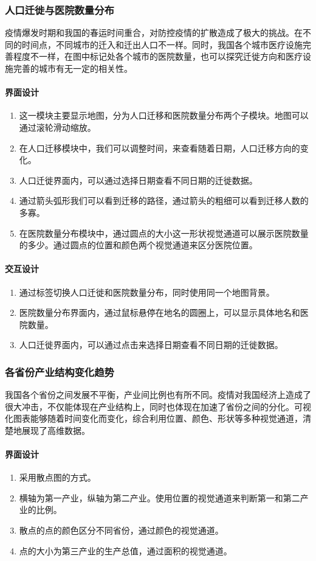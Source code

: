 \documentclass{ctexart}
\begin{document}
\subsubsection{人口迁徙与医院数量分布}
疫情爆发时期和我国的春运时间重合，对防控疫情的扩散造成了极大的挑战。在不同的时间点，不同城市的迁入和迁出人口不一样。同时，我国各个城市医疗设施完善程度不一样，在图中标记处各个城市的医院数量，也可以探究迁徙方向和医疗设施完善的城市有无一定的相关性。
\paragraph{界面设计}
\begin{enumerate}
    \item 这一模块主要显示地图，分为人口迁移和医院数量分布两个子模块。地图可以通过滚轮滑动缩放。
    \item 在人口迁移模块中，我们可以调整时间，来查看随着日期，人口迁移方向的变化。
    \item 人口迁徙界面内，可以通过选择日期查看不同日期的迁徙数据。
    \item 通过箭头弧形我们可以看到迁移的路径，通过箭头的粗细可以看到迁移人数的多寡。
    \item 在医院数量分布模块中，通过圆点的大小这一形状视觉通道可以展示医院数量的多少。通过圆点的位置和颜色两个视觉通道来区分医院位置。
\end{enumerate}

\paragraph{交互设计}
\begin{enumerate}
\item 通过标签切换人口迁徙和医院数量分布，同时使用同一个地图背景。
\item 医院数量分布界面内，通过鼠标悬停在地名的圆圈上，可以显示具体地名和医院数量。
\item 人口迁徙界面内，可以通过点击来选择日期查看不同日期的迁徙数据。
\end{enumerate}
\subsubsection{各省份产业结构变化趋势}
我国各个省份之间发展不平衡，产业间比例也有所不同。疫情对我国经济上造成了很大冲击，不仅能体现在产业结构上，同时也体现在加速了省份之间的分化。可视化图表能够随着时间变化而变化，综合利用位置、颜色、形状等多种视觉通道，清楚地展现了高维数据。
\paragraph{界面设计}
\begin{enumerate}
    \item 采用散点图的方式。
    \item 横轴为第一产业，纵轴为第二产业。使用位置的视觉通道来判断第一和第二产业的比例。
    \item 散点的点的颜色区分不同省份，通过颜色的视觉通道。
    \item 点的大小为第三产业的生产总值，通过面积的视觉通道。
\end{enumerate}
\end{document}
